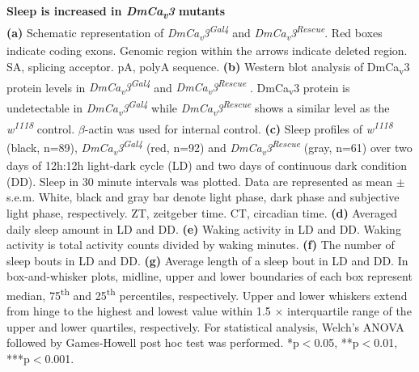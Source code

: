 \label{fig:3}
\textbf{Sleep is increased in \emph{DmCa\textsubscript{v}3} mutants}
\\
\textbf{(a)} Schematic representation of \emph{DmCa\textsubscript{v}3\textsuperscript{Gal4}} and \emph{DmCa\textsubscript{v}3\textsuperscript{Rescue}}. 
Red boxes indicate coding exons.
Genomic region within the arrows indicate deleted region.
SA, splicing acceptor. pA, polyA sequence.  
\textbf{(b)} Western blot analysis of DmCa\textsubscript{v}3 protein levels in \emph{DmCa\textsubscript{v}3\textsuperscript{Gal4}} and \emph{DmCa\textsubscript{v}3\textsuperscript{Rescue}} .
DmCa\textsubscript{v}3 protein is undetectable in \emph{DmCa\textsubscript{v}3\textsuperscript{Gal4}} while \emph{DmCa\textsubscript{v}3\textsuperscript{Rescue}}  shows a similar level as the \emph{w\textsuperscript{1118}} control.
$\beta$-actin was used for internal control.
\textbf{(c)} Sleep profiles of \emph{w\textsuperscript{1118}} (black, n=89), \emph{DmCa\textsubscript{v}3\textsuperscript{Gal4}} (red, n=92) and \emph{DmCa\textsubscript{v}3\textsuperscript{Rescue}}  (gray, n=61) over two days of 12h:12h light-dark cycle (LD) and two days of continuous dark condition (DD).
Sleep in 30 minute intervals was plotted.
Data are represented as mean $\pm$ s.e.m.
White, black and gray bar denote light phase, dark phase and subjective light phase, respectively.
ZT, zeitgeber time.
CT, circadian time.
\textbf{(d)} Averaged daily sleep amount in LD and DD.
\textbf{(e)} Waking activity in LD and DD.
Waking activity is total activity counts divided by waking minutes.
\textbf{(f)} The number of sleep bouts in LD and DD.
\textbf{(g)} Average length of a sleep bout in LD and DD.
In box-and-whisker plots, midline, upper and lower boundaries of each box represent median, 75\textsuperscript{th} and 25\textsuperscript{th} percentiles, respectively.
Upper and lower whiskers extend from hinge to the highest and lowest value within 1.5 $\times$ interquartile range of the upper and lower quartiles, respectively.
For statistical analysis, Welch's ANOVA followed by Games-Howell post hoc test was performed.
*p$<$0.05, **p$<$0.01, ***p$<$0.001.
  
  
  
  
  
  
  
  
  
  
  